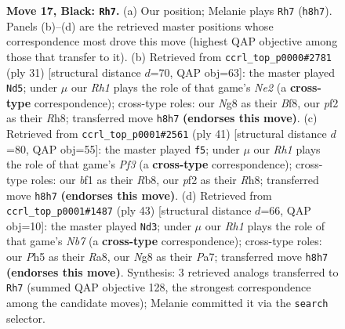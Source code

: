\documentclass[11pt]{article}
\begin{document}
\begin{figure}[p]
\caption{\textbf{Move 17, Black: \texttt{Rh7}.} (a) Our position; Melanie plays \texttt{Rh7} (\texttt{h8h7}). Panels (b)--(d) are the retrieved master positions whose correspondence most drove this move (highest QAP objective among those that transfer to it). (b) Retrieved from \texttt{ccrl\_top\_p0000\#2781} (ply 31) [structural distance $d$=70, QAP obj=63]: the master played \texttt{Nd5}; under $\mu$ our \emph{Rh1} plays the role of that game's \emph{Ne2} (a \textbf{cross-type} correspondence); cross-type roles: our \emph{N}g8 as their \emph{B}f8, our \emph{p}f2 as their \emph{R}h8; transferred move \texttt{h8h7} \textbf{(endorses this move)}. (c) Retrieved from \texttt{ccrl\_top\_p0001\#2561} (ply 41) [structural distance $d$=80, QAP obj=55]: the master played \texttt{f5}; under $\mu$ our \emph{Rh1} plays the role of that game's \emph{Pf3} (a \textbf{cross-type} correspondence); cross-type roles: our \emph{b}f1 as their \emph{R}b8, our \emph{p}f2 as their \emph{R}h8; transferred move \texttt{h8h7} \textbf{(endorses this move)}. (d) Retrieved from \texttt{ccrl\_top\_p0001\#1487} (ply 43) [structural distance $d$=66, QAP obj=10]: the master played \texttt{Nd3}; under $\mu$ our \emph{Rh1} plays the role of that game's \emph{Nb7} (a \textbf{cross-type} correspondence); cross-type roles: our \emph{P}h5 as their \emph{R}a8, our \emph{N}g8 as their \emph{P}a7; transferred move \texttt{h8h7} \textbf{(endorses this move)}. Synthesis: 3 retrieved analogs transferred to \texttt{Rh7} (summed QAP objective 128, the strongest correspondence among the candidate moves); Melanie committed it via the \texttt{search} selector.}
\label{fig:thought-m33}
\end{figure}

\clearpage
\end{document}
